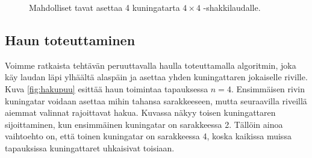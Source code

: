 \begin{figure}
\center
{}
\caption{Mahdolliset tavat asettaa 4 kuningatarta $4 \times 4$ -shakkilaudalle.}
\label{fig:kuning}
\end{figure}

\subsection{Haun toteuttaminen}

Voimme ratkaista tehtävän peruuttavalla haulla toteuttamalla algoritmin,
joka käy laudan läpi ylhäältä alaspäin ja asettaa yhden kuningattaren
jokaiselle riville.
Kuva \ref{fig:hakupuu} esittää haun toimintaa tapauksessa $n=4$.
Ensimmäisen rivin kuningatar voidaan asettaa mihin tahansa sarakkeeseen,
mutta seuraavilla riveillä aiemmat valinnat rajoittavat hakua.
Kuvassa näkyy toisen kuningattaren sijoittaminen,
kun ensimmäinen kuningatar on sarakkeessa 2.
Tällöin ainoa vaihtoehto on, että toinen kuningatar on sarakkeessa 4,
koska kaikissa muissa tapauksissa kuningattaret uhkaisivat toisiaan.


